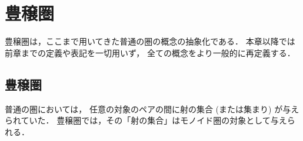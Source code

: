 \documentclass[titlepage]{ltjsreport}
\newcommand{\cat}[1]{\mathscr{#1}}
\newcommand{\obj}[1]{\lowercase{#1}}
\begin{document}
{

\chapter{豊穣圏}

豊穣圏は，ここまで用いてきた普通の圏の概念の抽象化である．
本章以降では前章までの定義や表記を一切用いず，
全ての概念をより一般的に再定義する．

\section{豊穣圏}

\def\C{\cat{C}}%
\def\mcat{\cat{V}}%
\newcommand\tprod{\otimes}%
\newcommand\tunit{1}%
\newcommand\assoc{\alpha}%
\newcommand\lunit{\lambda}%
\newcommand\runit{\rho}%
\def\a{\obj{a}}%
\def\b{\obj{b}}%
\def\c{\obj{c}}%
\def\d{\obj{d}}%

普通の圏においては，
任意の対象のペアの間に射の集合 (または集まり) が与えられていた．
豊穣圏では，その「射の集合」はモノイド圏の対象として与えられる．

}
\end{document}
